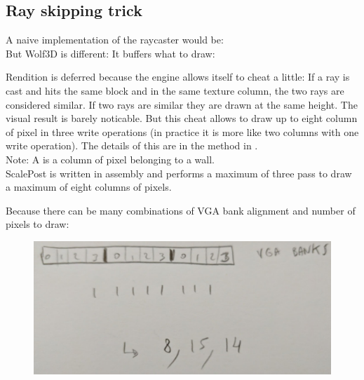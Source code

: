 \subsection{Ray skipping trick}
A naive implementation of the raycaster would be:\\

But Wolf3D is different: It buffers what to draw:


Rendition is deferred because the engine allows itself to cheat a little: If a ray is cast and hits the same block and in the same
texture column, the two rays are considered similar. If two rays are similar they are drawn at the same height. The visual result is 
barely noticable. But this cheat allows to draw up to eight column of pixel in three write operations (in practice it is more like two columns
with one write operation). The details of this are in the method  in .\\

Note: A  is a column of pixel belonging to a wall.\\
ScalePost is written in assembly and performs a maximum of three pass to draw a maximum of eight columns of pixels.

Because there can be many combinations of VGA bank alignment and number of pixels to draw:

\begin{figure}[H]
\centering
 \includegraphics[scale=0.3]{imgs/scalePost_explanation1.png}
 \end{figure}
 
